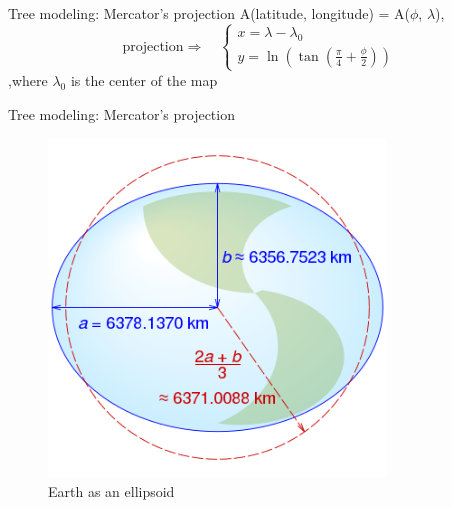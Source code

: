\documentclass[10pt]{beamer}
\begin{document}
\begin{frame}{Tree modeling: Mercator's projection}
  \Large
  A(latitude, longitude) = A($\phi$, $\lambda$),\\
  \begin{equation}
    \text{projection} \Longrightarrow \quad
    \left\{
    \begin{array}{l}
        x =  \lambda - \lambda_{0} \\
        y =  \ln(\tan(\frac{\pi}{4} + \frac{\phi}{2}))
    \end{array}
    \right.
  \end{equation}
  \vfill
  ,where $\lambda_{0}$ is the center of the map
\end{frame}


\begin{frame}{Tree modeling: Mercator's projection}
  \Large
  \begin{figure}[H]
    \centering
    \begin{minipage}{0.49\textwidth}
        \centering
        \includegraphics[width=0.8\textwidth]{images/WGS84_mean_Earth_radius.svg.png}
        \caption{Earth as an ellipsoid\cite{mercator-proj}}
    \end{minipage}\hfill
    \begin{minipage}{0.49\textwidth}
        \centering

\end{minipage}
\end{figure}
\end{frame}
\end{document}
